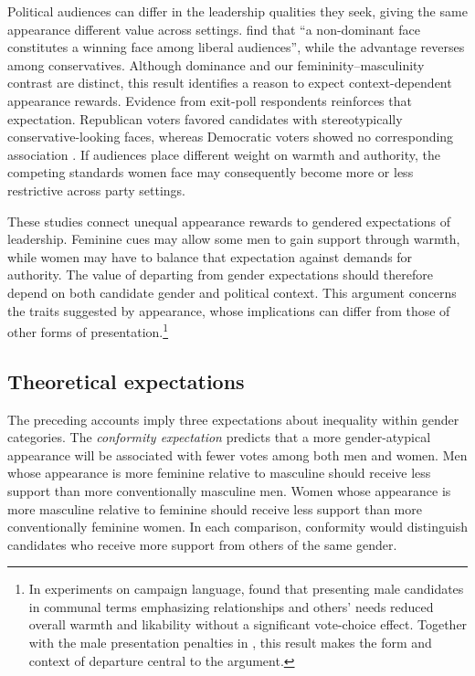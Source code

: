 \documentclass[11pt,a4paper]{article}\usepackage[]{graphicx}\usepackage[]{xcolor}
\begin{document}
Political audiences can differ in the leadership qualities they seek, giving the same appearance different value across settings. \textcite{LaustsenPetersen2016} find that ``a non-dominant face constitutes a winning face among liberal audiences'', while the advantage reverses among conservatives. Although dominance and our femininity--masculinity contrast are distinct, this result identifies a reason to expect context-dependent appearance rewards. Evidence from exit-poll respondents reinforces that expectation. Republican voters favored candidates with stereotypically conservative-looking faces, whereas Democratic voters showed no corresponding association \parencite{Olivola2018}. If audiences place different weight on warmth and authority, the competing standards women face may consequently become more or less restrictive across party settings.

These studies connect unequal appearance rewards to gendered expectations of leadership. Feminine cues may allow some men to gain support through warmth, while women may have to balance that expectation against demands for authority. The value of departing from gender expectations should therefore depend on both candidate gender and political context. This argument concerns the traits suggested by appearance, whose implications can differ from those of other forms of presentation.\footnote{In experiments on campaign language, \textcite[1195]{Wang2023} found that presenting male candidates in communal terms emphasizing relationships and others' needs reduced overall warmth and likability without a significant vote-choice effect. Together with the male presentation penalties in \textcite{Naunov2026}, this result makes the form and context of departure central to the argument.}

\subsection{Theoretical expectations}

The preceding accounts imply three expectations about inequality within gender categories. The \emph{conformity expectation} predicts that a more gender-atypical appearance will be associated with fewer votes among both men and women. Men whose appearance is more feminine relative to masculine should receive less support than more conventionally masculine men. Women whose appearance is more masculine relative to feminine should receive less support than more conventionally feminine women. In each comparison, conformity would distinguish candidates who receive more support from others of the same gender.
\end{document}
